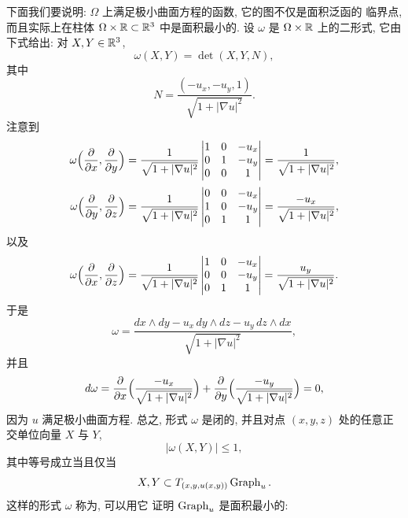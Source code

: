 下面我们要说明: $\Omega$ 上满足极小曲面方程的函数, 它的图不仅是面积泛函的
临界点, 而且实际上在柱体 $\Omega\times\mathbb{R}\subset\mathbb{R}^3$ 中是面积最小的. 设
$\omega$ 是 $\Omega\times\mathbb{R}$ 上的二形式, 它由下式给出: 对 $X,Y\in\mathbb{R}^3$,
\begin{equation}
\omega(X,Y)=\det(X,Y,N),
\label{eq:1.8}
\end{equation}
其中
\begin{equation}
N=\frac{(-u_x,-u_y,1)}{\sqrt{1+|\nabla u|^2}}.
\label{eq:1.9}
\end{equation}
注意到
\begin{align}
\omega\Bigl(\frac{\partial}{\partial x},\frac{\partial}{\partial y}\Bigr)
 &=\frac{1}{\sqrt{1+|\nabla u|^2}}
   \begin{vmatrix} 1 & 0 & -u_x\\ 0 & 1 & -u_y\\ 0 & 0 & 1\end{vmatrix}
  =\frac{1}{\sqrt{1+|\nabla u|^2}},
\label{eq:1.10}\\[2pt]
\omega\Bigl(\frac{\partial}{\partial y},\frac{\partial}{\partial z}\Bigr)
 &=\frac{1}{\sqrt{1+|\nabla u|^2}}
   \begin{vmatrix} 0 & 0 & -u_x\\ 1 & 0 & -u_y\\ 0 & 1 & 1\end{vmatrix}
  =\frac{-u_x}{\sqrt{1+|\nabla u|^2}},
\label{eq:1.11}
\end{align}
以及
\begin{equation}
\omega\Bigl(\frac{\partial}{\partial x},\frac{\partial}{\partial z}\Bigr)
 =\frac{1}{\sqrt{1+|\nabla u|^2}}
  \begin{vmatrix} 1 & 0 & -u_x\\ 0 & 0 & -u_y\\ 0 & 1 & 1\end{vmatrix}
 =\frac{u_y}{\sqrt{1+|\nabla u|^2}}.
\label{eq:1.12}
\end{equation}
于是
\begin{equation}
\omega=\frac{dx\wedge dy-u_x\,dy\wedge dz-u_y\,dz\wedge dx}
            {\sqrt{1+|\nabla u|^2}},
\label{eq:1.13}
\end{equation}
并且
\begin{equation}
d\omega=\frac{\partial}{\partial x}
  \Bigl(\frac{-u_x}{\sqrt{1+|\nabla u|^2}}\Bigr)
 +\frac{\partial}{\partial y}
  \Bigl(\frac{-u_y}{\sqrt{1+|\nabla u|^2}}\Bigr)=0,
\label{eq:1.14}
\end{equation}
因为 $u$ 满足极小曲面方程. 总之, 形式 $\omega$ 是闭的, 并且对点 $(x,y,z)$
处的任意正交单位向量 $X$ 与 $Y$,
\begin{equation}
|\omega(X,Y)|\leq 1,
\label{eq:1.15}
\end{equation}
其中等号成立当且仅当
\begin{equation}
X,Y\subset T_{(x,y,u(x,y))}\operatorname{Graph}_u.
\label{eq:1.16}
\end{equation}
这样的形式 $\omega$ 称为, 可以用它
证明 $\operatorname{Graph}_u$ 是面积最小的:

